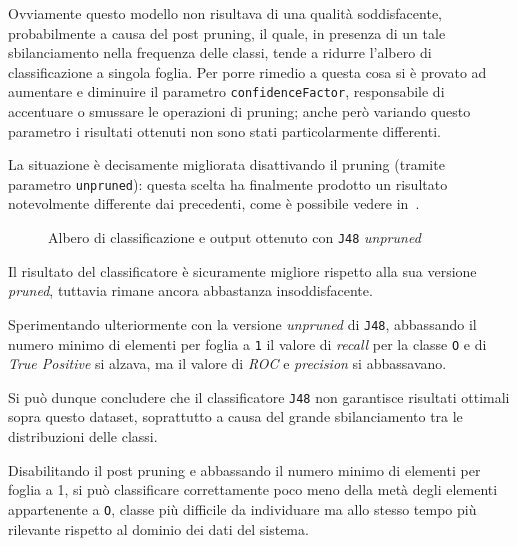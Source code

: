 Ovviamente questo modello non risultava di una qualità soddisfacente, probabilmente a causa del post pruning,
il quale, in presenza di un tale sbilanciamento nella frequenza delle classi, tende a ridurre l'albero di classificazione a singola foglia.
Per porre rimedio a questa cosa si è provato ad aumentare e diminuire  il parametro \texttt{confidenceFactor}, responsabile di accentuare o smussare le operazioni di pruning;
anche però variando questo parametro i risultati ottenuti non sono stati particolarmente differenti.

La situazione è decisamente migliorata disattivando il pruning (tramite parametro \texttt{unpruned}):
questa scelta ha finalmente prodotto un risultato notevolmente differente dai precedenti, come è possibile vedere in~.

\begin{figure}[H]
  \centering
  \begin{subfigure}{0.35\textwidth}
    \centering
    \label{fig:j48-unpruned:tree}
  \end{subfigure}
  \hfill
  \begin{subfigure}{0.6\textwidth}
    \centering
    \label{subfig:j48-unpruned:result}
  \end{subfigure}
  \caption{Albero di classificazione e output ottenuto con \texttt{J48} \emph{unpruned}}%
  \label{fig:j48-unpruned}
\end{figure}

Il risultato del classificatore è sicuramente migliore rispetto alla sua versione \emph{pruned}, tuttavia rimane ancora abbastanza insoddisfacente.

Sperimentando ulteriormente con la versione \emph{unpruned} di \texttt{J48},
abbassando il numero minimo di elementi per foglia a \texttt{1} il valore di \emph{recall} per la classe \texttt{O} e di \emph{True Positive} si alzava,
ma il valore di \emph{ROC} e \emph{precision} si abbassavano.

Si può dunque concludere che il classificatore \texttt{J48} non garantisce risultati ottimali sopra questo dataset, soprattutto a causa del grande sbilanciamento tra le distribuzioni delle classi.

Disabilitando il post pruning e abbassando il numero minimo di elementi per foglia a 1, si può classificare correttamente poco meno della metà degli elementi appartenente a \texttt{O}, classe più difficile da individuare ma allo stesso tempo più rilevante rispetto al dominio dei dati del sistema.

